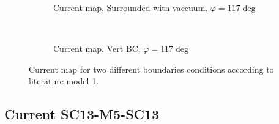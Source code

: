 \documentclass[../main.tex]{subfiles}
\begin{document}
\begin{figure}[H]
    \begin{subfigure}{0.4\textwidth}
        \centering
        
        \caption{Current map. Surrounded with vaccuum. $\varphi = 117 \deg$}
        \label{fig:first}
    \end{subfigure}\\
    \begin{subfigure}{0.4\textwidth}
        \centering
        
        \caption{Current map. Vert BC. $\varphi = 117 \deg$}
        \label{fig:first}
    \end{subfigure}
\caption{Current map for two different boundaries conditions according to literature model 1.}

\end{figure}

\subsection{Current SC13-M5-SC13}
\end{document}
